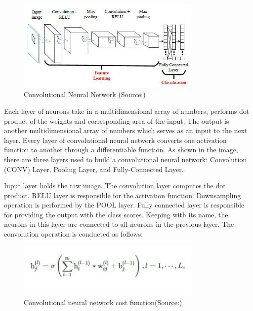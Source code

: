 \documentclass[conference]{IEEEtran}
\begin{document}
\begin{figure}[h!]
 \centering
 \includegraphics[width = 9cm]{cnn_arch.JPG}
 \caption{ Convolutional Neural Network (Source:\cite{cheung2012convolutional})}
 \label{fig 1: Convolutional Neural Network}
\end{figure}

Each layer of neurons take in a multidimensional array of numbers, performs dot product of the weights and corresponding area of the input. The output is another multidimensional array of numbers which serves as an input to the next layer. Every layer of convolutional neural network converts one activation function to another through a differentiable function. As shown in the image, there are three layers used to build a convolutional neural network: Convolution (CONV) Layer, Pooling Layer, and Fully-Connected Layer.

Input layer holds the raw image. The convolution layer computes the dot product. RELU layer is responsible for the activation function. Downsampling operation is performed by the POOL layer. Fully connected layer is responsible for providing the output with the class scores. Keeping with its name, the neurons in this layer are connected to all neurons in the previous layer. The convolution operation is conducted as follows:

\begin{figure}[h!]
 \centering
 \includegraphics[width = 9cm]{cnn_formula.JPG}
 \caption{ Convolutional neural network cost function(Source:\cite{lee2009convolutional})}
 \label{fig 1: Convolutional Neural Network cost function}
\end{figure}
\end{document}
